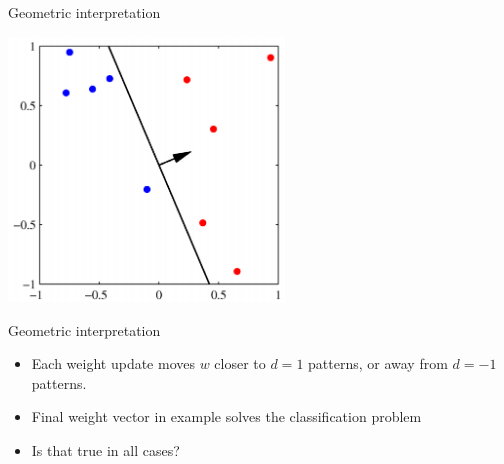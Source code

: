 \documentclass[notes]{beamer}
\providecommand{\tightlist}{%
  \setlength{\itemsep}{0pt}\setlength{\parskip}{0pt}}
\begin{document}
\begin{frame}{Geometric interpretation}

\centering 

\includegraphics[width=0.55000\textwidth]{2018-03-08-22-48-52.png}\\

\end{frame}

\begin{frame}{Geometric interpretation}

\begin{itemize}
\tightlist
\item
  Each weight update moves \(w\) closer to \(d = 1\) patterns, or away
  from \(d = -1\) patterns.
\item
  Final weight vector in example solves the classification problem
\item
  Is that true in all cases?
\end{itemize}

\end{frame}
\end{document}
